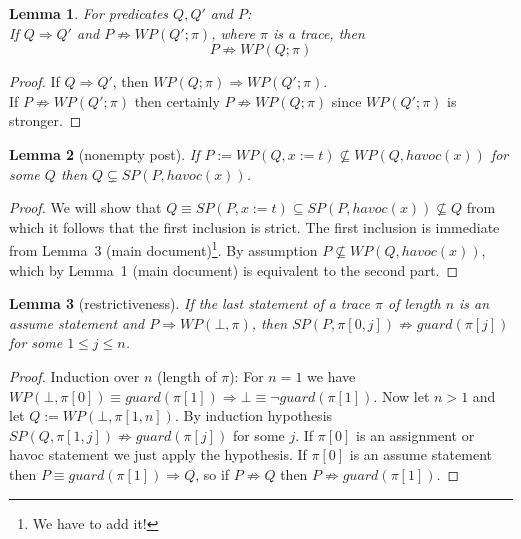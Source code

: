 \documentclass{article}
\newcommand{\limp}{\Rightarrow}
\newcommand{\WP}[2]{\mathit{WP}(#1,#2)}
\newcommand{\SP}[2]{\mathit{SP}(#1,#2)}
\newcommand{\havoc}{\mathit{havoc}}
\newcommand{\guard}{\mathit{guard}}
\newtheorem{lemma}{Lemma}
\begin{document}
\begin{lemma}
For predicates $Q,Q'$ and $P$:\\
If $Q \limp Q'$ and $P \not\limp WP(Q';\pi)$, where $\pi$ is a trace, then\\
$$P \not\limp WP(Q;\pi)$$
\end{lemma}
\begin{proof}
	If $Q \limp Q'$, then $WP(Q;\pi) \limp WP(Q';\pi)$.\\
	If $P \not\limp WP(Q';\pi)$ then certainly $P \not\limp WP(Q; \pi)$ since $WP(Q'; \pi)$ is stronger.
\end{proof}
\begin{lemma}[nonempty post]\label{lemma:nonempty_post}
	If $P := \WP{Q}{x := t} \nsubseteq \WP{Q}{\havoc(x)}$ for some $Q$ then $Q \subsetneq \SP{P}{\havoc(x)}$.
\end{lemma}
\begin{proof}
	We will show that $Q \equiv \SP{P}{x := t} \subseteq \SP{P}{\havoc(x)} \not\subseteq Q$ from which it follows that the first inclusion is strict.
	The first inclusion is immediate from Lemma~3 (main document)\footnote{We have to add it!}.
	By assumption $P \not\subseteq \WP{Q}{\havoc(x)}$, which by Lemma~1 (main document) is equivalent to the second part.
\end{proof}
\begin{lemma}[restrictiveness]\label{lemma:spfalse}
	If the last statement of a trace $\pi$ of length $n$ is an assume statement and $P \limp \WP{\bot}{\pi}$, then $\SP{P}{\pi[0, j]} \not\limp \guard(\pi[j])$ for some $1 \leq j \leq n$.
\end{lemma}
\begin{proof}
	Induction over $n$ (length of $\pi$):
	For $n = 1$ we have $\WP{\bot}{\pi[0]} \equiv \guard(\pi[1]) \limp \bot \equiv \neg \guard(\pi[1])$.
	Now let $n > 1$ and let $Q := \WP{\bot}{\pi[1, n]}$.
	By induction hypothesis $\SP{Q}{\pi[1, j]} \not\limp \guard(\pi[j])$ for some $j$.
	If $\pi[0]$ is an assignment or havoc statement we just apply the hypothesis.
	If $\pi[0]$ is an assume statement then $P \equiv \guard(\pi[1]) \limp Q$, so if $P \not\limp Q$ then $P \not\limp \guard(\pi[1])$.
\end{proof}
\end{document}
